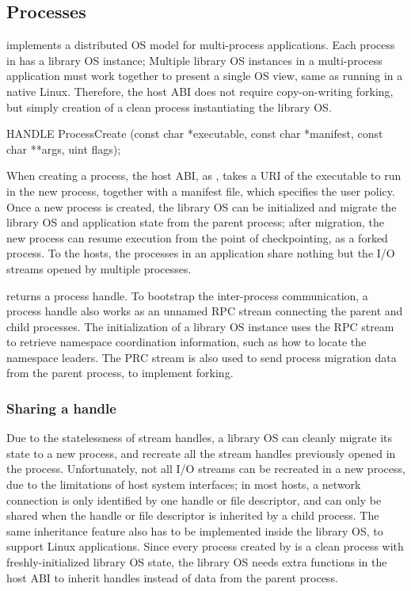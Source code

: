 \subsection{Processes}
\label{sec:abi:proc}


\graphene{} implements a distributed OS model for multi-process applications.
Each process in \graphene{} has a library OS instance;
Multiple library OS instances in a multi-process application must work together
to present a single OS view,
same as running in a native Linux.
Therefore, the host ABI does not require copy-on-writing forking,
but simply creation of a clean process instantiating the library OS.




\begin{paldef}
HANDLE ProcessCreate (const char *executable,
                      const char *manifest,
                      const char **args, uint flags);
\end{paldef}

When creating a process, the host ABI, as , takes a URI of the executable to run in the new process,
together with a manifest file, which specifies the user policy.
Once a new process is created, the library OS can be initialized
and migrate the library OS and application state from the parent process;
after migration, the new process can resume execution from the point of checkpointing,
as a forked process.
To the hosts, the processes in an application share nothing
but the I/O streams opened by multiple processes.


 returns a process handle.
To bootstrap the inter-process communication, a process handle also works as an unnamed RPC stream connecting the parent and child processes.
The initialization of a library OS instance uses the RPC stream
to retrieve namespace coordination information, such as how to locate the namespace leaders.
The PRC stream is also used to send process migration data
from the parent process, to implement forking.






\subsubsection*{Sharing a handle}




Due to the statelessness of stream handles,
a library OS can cleanly migrate its state to a new process, and recreate all the stream handles previously opened in the process.
Unfortunately, not all I/O streams can be recreated
in a new process, due to the limitations of host system interfaces;
in most hosts, a network connection is only identified by one handle or file descriptor,
and can only be shared when the handle or file descriptor
is inherited by a child process.
The same inheritance feature also has to be implemented
inside the library OS, to support Linux applications.
Since every process created by  is a clean \graphene{} process with freshly-initialized library OS state,
the library OS needs extra functions in the host ABI
to inherit handles instead of data from the parent process.


